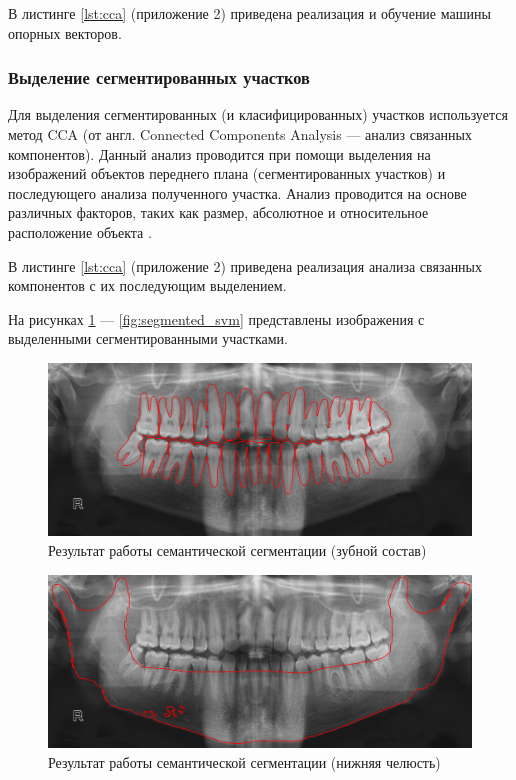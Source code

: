 В листинге \ref{lst:cca} (приложение 2)  приведена реализация и обучение машины опорных векторов.

\subsubsection{Выделение сегментированных участков}

Для выделения сегментированных (и класифицированных) участков используется метод CCA (от англ. Connected Components Analysis --- анализ связанных компонентов). Данный анализ проводится при помощи выделения на изображений объектов переднего плана (сегментированных участков) и последующего анализа полученного участка. Анализ проводится на основе различных факторов, таких как размер, абсолютное и относительное расположение объекта \cite{cca}.

В листинге \ref{lst:cca} (приложение 2)  приведена реализация анализа связанных компонентов с их последующим выделением.

На рисунках \ref{fig:segmented} --- \ref{fig:segmented_svm} представлены изображения с выделенными сегментированными участками.

\begin{figure}[H]
	\centering
	\includegraphics[width=\textwidth]{img/segmented.png}
	\caption{Результат работы семантической сегментации (зубной состав)}
	\label{fig:segmented}
\end{figure}

\begin{figure}[H]
	\centering
	\includegraphics[width=\textwidth]{img/segmented_mand.png}
	\caption{Результат работы семантической сегментации (нижняя челюсть)}
	\label{fig:segmented_mand}
\end{figure}

